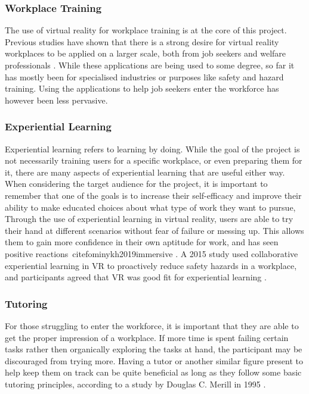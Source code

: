 \subsubsection{Workplace Training}
The use of virtual reality for workplace training is at the core of this project. Previous studies have shown that there is a strong desire for virtual reality workplaces to be applied on a larger scale, both from job seekers and welfare professionals \cite{prasolova2019empowering}. While these applications are being used to some degree, so far it has mostly been for specialised industries or purposes like safety and hazard training. Using the applications to help job seekers enter the workforce has however been less pervasive. 

\subsubsection{Experiential Learning}
Experiential learning refers to learning by doing. While the goal of the project is not necessarily training users for a specific workplace, or even preparing them for it, there are many aspects of experiential learning that are useful either way. When considering the target audience for the project, it is important to remember that one of the goals is to increase their self-efficacy and improve their ability to make educated choices about what type of work they want to pursue, Through the use of experiential learning in virtual reality, users are able to try their hand at different scenarios without fear of failure or messing up. This allows them to gain more confidence in their own aptitude for work, and has seen positive reactions\ cite{fominykh2019immersive} \cite{prasolova2019empowering}. A 2015 study used collaborative experiential learning in VR to proactively reduce safety hazards in a workplace, and participants agreed that VR was good fit for experiential learning \cite{le2015social}.

\subsubsection{Tutoring}
For those struggling to enter the workforce, it is important that they are able to get the proper impression of a workplace. If more time is spent failing certain tasks rather then organically exploring the tasks at hand, the participant may be discouraged from trying more. Having a tutor or another similar figure present to help keep them on track can be quite beneficial as long as they follow some basic tutoring principles, according to a study by Douglas C. Merill in 1995 \cite{merrill1995tutoring}.

